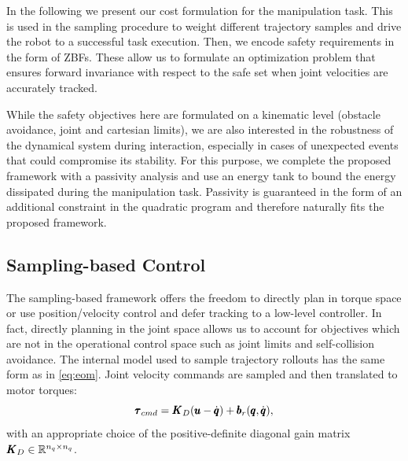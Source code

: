 In the following we present our cost formulation for the manipulation task. This is used in the sampling procedure to weight different trajectory samples and drive the robot to a successful task execution. Then, we encode safety requirements in the form of ZBFs. These allow us to formulate an optimization problem that ensures forward invariance with respect to the safe set when joint velocities are accurately tracked.

While the safety objectives here are formulated on a kinematic level (obstacle avoidance, joint and cartesian limits), we are also interested in the robustness of the dynamical system during interaction, especially in cases of unexpected events that could compromise its stability. For this purpose, we complete the proposed framework with a passivity analysis and use an energy tank to bound the energy dissipated during the manipulation task. Passivity is guaranteed in the form of an additional constraint in the quadratic program and therefore naturally fits the proposed framework.

\subsection{Sampling-based Control}
The sampling-based framework offers the freedom to directly plan in torque space or use position/velocity control and defer tracking to a low-level controller. In fact, directly planning in the joint space allows us to account for objectives which are not in the operational control space such as joint limits and self-collision avoidance. The internal model used to sample trajectory rollouts has the same form as in \eqref{eq:eom}. Joint velocity commands are sampled and then translated to motor torques:
\begin{equation}
    \pmb{\tau}_{cmd} = \pmb{K}_{D} (\pmb{u} - \dot{\pmb{q}}) + \pmb{b}_{r}(\pmb{q}, \dot{\pmb{q}}),
\end{equation}
with an appropriate choice of the positive-definite diagonal gain matrix $\pmb{K}_{D} \in \mathbb{R}^{n_q\times n_q}$. 

